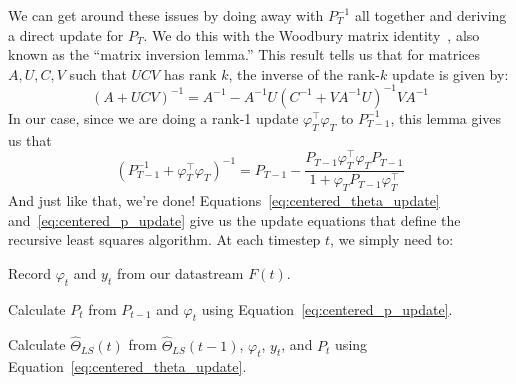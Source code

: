 We can get around these issues by doing away with $P_T^{-1}$ all together and
deriving a direct update for $P_T$. We do this with the Woodbury matrix
identity~\cite{woodbury1950inverting}, also known as the ``matrix inversion
lemma.'' This result tells us that for matrices $A, U, C, V$ such that $UCV$ has rank $k$, the inverse of the rank-$k$ update is given by:
\begin{equation}
  \left(A + UCV\right)^{-1} = A^{-1} - A^{-1}U\left(C^{-1} + VA^{-1}U\right)^{-1}VA^{-1}
\end{equation}
In our case, since we are doing a rank-1 update $\varphi_T^\top \varphi_T$ to
$P_{T-1}^{-1}$, this lemma gives us that
\begin{equation}
  \label{eq:centered_p_update}
  \left(P_{T-1}^{-1} + \varphi_T^\top \varphi_T\right)^{-1} = P_{T - 1} - \frac{P_{T-1}\varphi_T^\top \varphi_T P_{T-1}}{1 + \varphi_T P_{T-1} \varphi_T^\top}
\end{equation}
And just like that, we're done! Equations~\ref{eq:centered_theta_update}
and~\ref{eq:centered_p_update} give us the update equations that define the
recursive least squares algorithm. At each timestep $t$, we simply need to:
\begin{enumerate}
\begin{singlespace}
  \item Record $\varphi_t$ and $y_t$ from our datastream $F(t)$. 
  \item Calculate $P_t$ from $P_{t-1}$ and $\varphi_t$ using Equation~\ref{eq:centered_p_update}. 
  \item Calculate $\hat\Theta_{LS}(t)$ from $\hat\Theta_{LS}(t-1)$, $\varphi_t$, $y_t$, and $P_{t}$ using Equation~\ref{eq:centered_theta_update}. 
\end{singlespace}
\end{enumerate}

